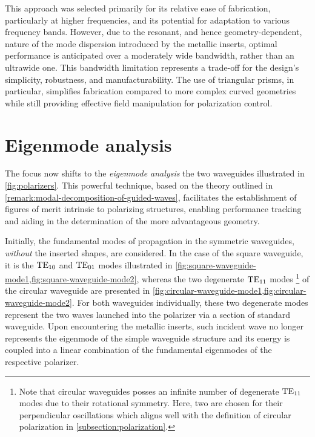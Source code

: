 \documentclass[11pt,a4paper,twoside,openany]{report}
\begin{document}
This approach was selected primarily for its relative ease of fabrication, particularly at higher frequencies, and its potential for adaptation to various frequency bands. However, due to the resonant, and hence geometry-dependent, nature of the mode dispersion introduced by the metallic inserts, optimal performance is anticipated over a moderately wide bandwidth, rather than an ultrawide one. This bandwidth limitation represents a trade-off for the design's simplicity, robustness, and manufacturability. The use of triangular prisms, in particular, simplifies fabrication compared to more complex curved geometries while still providing effective field manipulation for polarization control.

\section{Eigenmode analysis}
The focus now shifts to the \emph{eigenmode analysis} the two waveguides illustrated in \cref{fig:polarizers}. This powerful technique, based on the theory outlined in \cref{remark:modal-decomposition-of-guided-waves}, facilitates the establishment of figures of merit intrinsic to polarizing structures, enabling performance tracking and aiding in the determination of the more advantageous geometry.

Initially, the fundamental modes of propagation in the symmetric waveguides, \emph{without} the inserted shapes, are considered. In the case of the square waveguide, it is the $\text{TE}_{10}$ and $\text{TE}_{01}$ modes illustrated in \cref{fig:square-waveguide-mode1,fig:square-waveguide-mode2}, whereas the two degenerate $\text{TE}_{11}$ modes%
    \footnote{Note that circular waveguides posses an infinite number of degenerate $\text{TE}_{11}$ modes due to their rotational symmetry. Here, two are chosen for their perpendicular oscillations which aligns well with the definition of circular polarization in \cref{subsection:polarization}.}
of the circular waveguide are presented in \cref{fig:circular-waveguide-mode1,fig:circular-waveguide-mode2}. For both waveguides individually, these two degenerate modes represent the two waves launched into the polarizer via a section of standard waveguide. Upon encountering the metallic inserts, such incident wave no longer represents the eigenmode of the simple waveguide structure and its energy is coupled into a linear combination of the fundamental eigenmodes of the respective polarizer.
\end{document}
